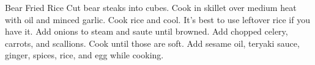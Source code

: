 \documentclass[../cookbook.tex]{subfiles}
\begin{document}
\begin{recipe}{Bear Fried Rice}{}{}
    Cut bear steaks into cubes.
    Cook in skillet over medium heat with oil and minced garlic.
    Cook rice and cool. It's best to use leftover rice if you have it.
    Add onions to steam and saute until browned.
    Add chopped celery, carrots, and scallions. Cook until those are soft.
    Add sesame oil, teryaki sauce, ginger, spices, rice, and egg while cooking.
\end{recipe}
\end{document}
